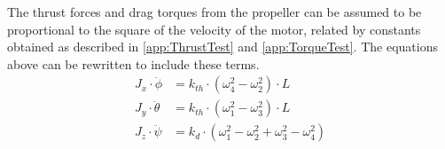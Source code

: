 The thrust forces and drag torques from the propeller can be assumed to be proportional to the square of the velocity of the motor, related by constants obtained as described in \autoref{app:ThrustTest} and \ref{app:TorqueTest}. The equations above can be rewritten to include these terms.
%
\begin{align}
J_x\cdot\ddot{\phi}&=k_{th} \cdot(\omega^2_4-\omega^2_2) \cdot L \label{eq:AngleEqVelocities1}\\
J_y \cdot\ddot{\theta}&=k_{th} \cdot(\omega^2_1-\omega^2_3) \cdot L \label{eq:AngleEqVelocities2} \\
J_z\cdot\ddot{\psi}&=k_d \cdot(\omega^2_1-\omega^2_2+\omega^2_3-\omega^2_4)
\label{eq:AngleEqVelocities3}
\end{align}


